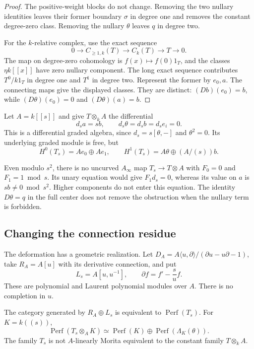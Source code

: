 \begin{proof}
The positive-weight blocks do not change.
Removing the two nullary identities leaves their
former boundary $\sigma$ in degree one and removes
the constant degree-zero class. Removing the
nullary $\theta$ leaves $q$ in degree two.

For the $k$-relative complex, use the exact sequence
\[
 0\to C_{\geq1,k}(T)\to C_k(T)\to T\to0.
\]
The map on degree-zero cohomology is
$f(x)\mapsto f(0)1_T$, and the classes
$\eta k[[x]]$ have zero nullary component.
The long exact sequence contributes
$T^0/k1_T$ in degree one and $T^1$ in degree two.
Represent the former by $e_0,a$. The connecting
maps give the displayed classes. They are distinct:
$(Db)(e_0)=b$, while $(D\theta)(e_0)=0$ and
$(D\theta)(a)=b$.
\end{proof}

Let $A=k[[s]]$ and give $T\otimes_k A$ the
differential
\begin{equation}\label{v4-arith:centers:eq:normal-family}
 d_sa=sb,\qquad d_s\theta=d_sb=d_se_i=0.
\end{equation}
This is a differential graded algebra, since
$d_s=s[\theta,-]$ and $\theta^2=0$. Its underlying
graded module is free, but
\[
 H^0(T_s)=Ae_0\oplus Ae_1,\qquad
 H^1(T_s)=A\theta\oplus(A/(s))b.
\]

Even modulo $s^2$, there is no uncurved
$A_\infty$ map $T_s\to T\otimes A$ with
$F_0=0$ and $F_1=1\bmod s$. Its unary equation
would give $F_1d_s=0$, whereas its value on $a$
is $sb\ne0\bmod s^2$. Higher components do not
enter this equation. The identity $D\theta=q$
in the full center does not remove the obstruction
when the nullary term is forbidden.

\subsection{Changing the connection residue}
\label{v4-arith:centers:subsec:kummer}

The deformation has a geometric realization. Let
$D_A=A\langle u,\partial\rangle/(\partial u-u\partial-1)$,
take $R_A=A[u]$ with its derivative connection, and put
\[
 L_s=A[u,u^{-1}],\qquad
 \partial f=f'-\frac{s}{u}f.
\]
These are polynomial and Laurent polynomial modules
over $A$. There is no completion in $u$.

\begin{theorem}\label{v4-arith:centers:thm:kummer}
The category generated by $R_A\oplus L_s$ is
equivalent to $\operatorname{Perf}(T_s)$.
For $K=k((s))$,
\[
 \operatorname{Perf}(T_s\otimes_A K)
 \simeq
 \operatorname{Perf}(K)\oplus
 \operatorname{Perf}(\Lambda_K(\theta)).
\]
The family $T_s$ is not $A$-linearly Morita equivalent
to the constant family $T\otimes_k A$.
\end{theorem}

